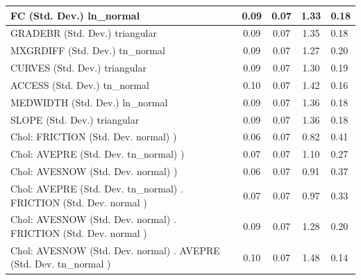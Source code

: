 \begin{table}
\begin{center}
\begin{tabular}{|l|l|c|c|c|l|}
			\hline
			FC (Std. Dev.) ln_normal &  & 0.09 & 0.07 & 1.33 & 0.18 \\
			\hline
			GRADEBR (Std. Dev.) triangular &  & 0.09 & 0.07 & 1.35 & 0.18 \\
			\hline
			MXGRDIFF (Std. Dev.) tn_normal &  & 0.09 & 0.07 & 1.27 & 0.20 \\
			\hline
			CURVES (Std. Dev.) triangular &  & 0.09 & 0.07 & 1.30 & 0.19 \\
			\hline
			ACCESS (Std. Dev.) tn_normal &  & 0.10 & 0.07 & 1.42 & 0.16 \\
			\hline
			MEDWIDTH (Std. Dev.) ln_normal &  & 0.09 & 0.07 & 1.36 & 0.18 \\
			\hline
			SLOPE (Std. Dev.) triangular &  & 0.09 & 0.07 & 1.36 & 0.18 \\
			\hline
			 Chol: FRICTION (Std. Dev. normal) ) &  & 0.06 & 0.07 & 0.82 & 0.41 \\
			\hline
			 Chol: AVEPRE (Std. Dev. tn_normal) ) &  & 0.07 & 0.07 & 1.10 & 0.27 \\
			\hline
			 Chol: AVESNOW (Std. Dev. normal) ) &  & 0.06 & 0.07 & 0.91 & 0.37 \\
			\hline
			 Chol: AVEPRE (Std. Dev. tn_normal) . FRICTION (Std. Dev.   normal ) &  & 0.07 & 0.07 & 0.97 & 0.33 \\
			\hline
			 Chol: AVESNOW (Std. Dev. normal) . FRICTION (Std. Dev.   normal ) &  & 0.09 & 0.07 & 1.28 & 0.20 \\
			\hline
			 Chol: AVESNOW (Std. Dev. normal) . AVEPRE (Std. Dev.   tn_normal ) &  & 0.10 & 0.07 & 1.48 & 0.14 \\
			\hline
		\end{tabular}
	\end{center}
\end{table}